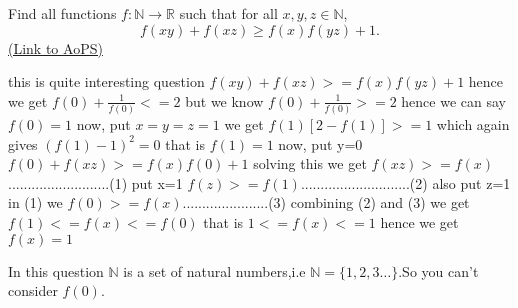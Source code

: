 \begin{problem}
	Find all functions $ f: \mathbb{N}\rightarrow\mathbb{R}$ such that for all $ x,y,z\in\mathbb{N}$,
\[f(xy)+f(xz)\geq f(x)f(yz)+1.\]
	\flushright \href{https://artofproblemsolving.com/community/c6h172672}{(Link to AoPS)}
\end{problem}



\begin{mysolution}
	this is quite interesting question
$ f(xy) + f(xz) >= f(x)f(yz)+1$
hence we get
$ f(0)+\frac{1}{f(0)}<=2$
but we know
$ f(0)+\frac{1}{f(0)}>=2$
hence we can say
$ f(0)=1$
now, put $ x=y=z=1$
we get
$ f(1)[2-f(1)]>=1$
which again gives
$ (f(1)-1)^2=0$
that is $ f(1)=1$
now,
put y=0
$ f(0)+f(xz)>=f(x)f(0)+1$
solving this we get
$ f(xz)>=f(x)$..........................(1)
put x=1
$ f(z)>=f(1)$............................(2)
also put z=1 in (1)
we $ f(0)>=f(x)$......................(3)
combining (2) and (3)
we get
$ f(1)<=f(x)<=f(0)$
that is
$ 1<=f(x)<=1$
hence we get
$ f(x)=1$
\end{mysolution}



\begin{mysolution}
	In this question $ \mathbb{N}$ is a set of natural numbers,i.e $ \mathbb{N}=\{1,2,3\dots\}$.So you can't consider $ f(0)$.
\end{mysolution}



